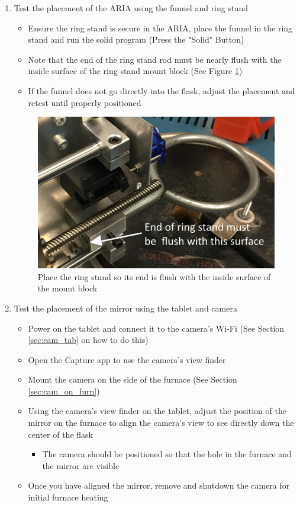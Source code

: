 \documentclass[letterpaper,11pt]{article}
\begin{document}
\begin{enumerate}
    \item Test the placement of the ARIA using the funnel and ring stand
         \begin{itemize}
         \item Ensure the ring stand is secure in the ARIA, place the 
            funnel in the ring stand and run the solid program (Press the  
            "Solid" Button)
		 \item Note that the end of the ring stand rod must be nearly flush with the inside surface
             of the ring stand mount block (See Figure \ref{fig:flush_r_stand})
         \item If the funnel does not go directly into the flask, adjust the placement and retest 
            until properly positioned
         \end{itemize}
         
\begin{figure}[H]
\centering\includegraphics[width=.5\textwidth]{flush_r_stand.jpg}
\caption{Place the ring stand so its end is flush with the inside surface of the mount block}
\label{fig:flush_r_stand}
\end{figure}
         
    \item Test the placement of the mirror using the tablet and camera %
        \begin{itemize}
        \item Power on the tablet and connect it to the camera's Wi-Fi (See 
            Section \ref{sec:cam_tab} on how to do this)
        \item Open the Capture app to use the camera's view finder
        \item Mount the camera on the side of the furnace (See Section 
            \ref{sec:cam_on_furn})
           
        \item Using the camera's view finder on the tablet, adjust the
            position of the mirror on the furnace to align the camera's view to 
            see directly down the center of the flask
            \begin{itemize}
            \item The camera should be positioned so that the hole in the 
                furnace and the mirror are visible 
            \end{itemize}
        \item Once you have aligned the mirror, remove and shutdown the camera 
            for initial furnace heating
        \end{itemize}


\end{enumerate}
\end{document}
